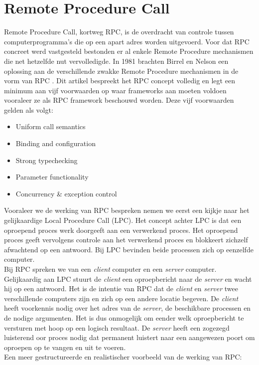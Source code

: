 \section{Remote Procedure Call}
Remote Procedure Call, kortweg RPC, is de overdracht van controle tussen computerprogramma's die op een apart adres worden uitgevoerd. Voor dat RPC concreet werd vastgesteld bestonden er al enkele Remote Procedure mechanismen die net hetzelfde nut vervolledigde. In 1981 brachten Birrel en Nelson een oplossing aan de verschillende zwakke Remote Procedure mechanismen in de vorm van RPC \autocite{Nelson1982}. Dit artikel bespreekt het RPC concept volledig en legt een minimum aan vijf voorwaarden op waar frameworks aan moeten voldoen vooraleer ze als RPC framework beschouwd worden. Deze vijf voorwaarden gelden als volgt:
\begin{itemize}
    \item Uniform call semantics
    \item Binding and configuration
    \item Strong typechecking
    \item Parameter functionality
    \item Concurrency \& exception control
\end{itemize}
Vooraleer we de werking van RPC bespreken nemen we eerst een kijkje naar het gelijkaardige Local Procedure Call (LPC). Het concept achter LPC is dat een oproepend proces werk doorgeeft aan een verwerkend proces. Het oproepend proces geeft vervolgens controle aan het verwerkend proces en blokkeert zichzelf afwachtend op een antwoord. Bij LPC bevinden beide processen zich op eenzelfde computer.\\
Bij RPC spreken we van een \textit{client} computer en een \textit{server} computer. Gelijkaardig aan LPC stuurt de \textit{client} een oproepbericht naar de \textit{server} en wacht hij op een antwoord. Het is de intentie van RPC dat de \textit{client} en \textit{server} twee verschillende computers zijn en zich op een andere locatie begeven. De \textit{client} heeft voorkennis nodig over het adres van de \textit{server}, de beschikbare processen en de nodige argumenten. Het is dus onmogelijk om eender welk oproepbericht te versturen met hoop op een logisch resultaat. De \textit{server} heeft een zogezegd luisterend oor proces nodig dat permanent luistert naar een aangewezen poort om oproepen op te vangen en uit te voeren.\\
Een meer gestructureerde en realistischer voorbeeld van de werking van RPC:
